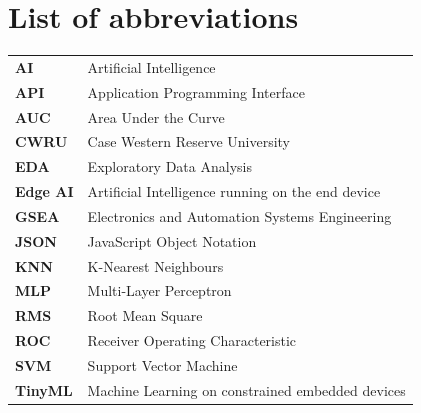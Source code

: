 \documentclass[11pt,a4paper,oneside]{report}
\numberwithin{figure}{chapter}
\numberwithin{table}{chapter}
\numberwithin{equation}{chapter}
\begin{document}
	\cleardoublepage
	\listoftables
	
	\cleardoublepage
	\chapter*{List of abbreviations}
	
	\noindent
	\begin{tabularx}{\textwidth}{@{}l@{\hspace{1.4em}}X@{}}
		\toprule
		\textbf{AI}     & Artificial Intelligence \\
		\textbf{API}    & Application Programming Interface \\
		\textbf{AUC}    & Area Under the Curve \\
		\textbf{CWRU}   & Case Western Reserve University \\
		\textbf{EDA}    & Exploratory Data Analysis \\
		\textbf{Edge AI}& Artificial Intelligence running on the end device \\
		\textbf{GSEA}   & Electronics and Automation Systems Engineering \\
		\textbf{JSON}   & JavaScript Object Notation \\
		\textbf{KNN}    & K-Nearest Neighbours \\
		\textbf{MLP}    & Multi-Layer Perceptron \\
		\textbf{RMS}    & Root Mean Square \\
		\textbf{ROC}    & Receiver Operating Characteristic \\
		\textbf{SVM}    & Support Vector Machine \\
		\textbf{TinyML} & Machine Learning on constrained embedded devices \\
		\bottomrule
	\end{tabularx}
	
	\cleardoublepage
	\setcounter{page}{1}
	
	
	
	
	
	
	
	
	\cleardoublepage
	\printbibliography[heading=bibintoc,title={References}]
	
\end{document}
